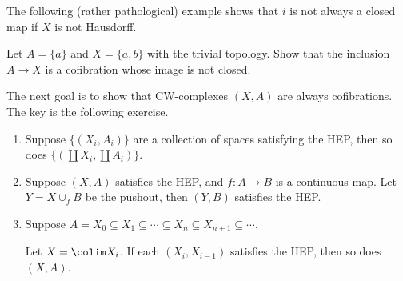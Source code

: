 \documentclass[ma3408.tex]{subfiles}
\begin{document}
The following (rather pathological) example shows that $i$ is not always a closed map if $X$ is not Hausdorff. 
\begin{exercise}{}{}
Let $A = \{ a \}$ and $X = \{ a , b\}$ with the trivial topology. Show that the inclusion $A \to X$ is a cofibration whose image is not closed. 
\end{exercise}
\begin{Rem}
The next goal is to show that CW-complexes $(X,A)$ are always cofibrations. The key is the following exercise. 
\end{Rem}
\begin{exercise}{}{}
\begin{enumerate}[label=(\alph*)]
  	\item Suppose $\{ (X_i,A_i)\}$ are a collection of spaces satisfying the HEP, then so does $\{ (\coprod X_i, \coprod A_i) \}$.
  	\item Suppose $(X,A)$ satisfies the HEP, and $f \colon A \to B$ is a continuous map. Let $Y = X \cup_f B$ be the pushout, then $(Y,B)$ satisfies the HEP. 
  	\item Suppose $A = X_0 \subseteq X_1 \subseteq \cdots \subseteq X_n \subseteq X_{n+1} \subseteq \cdots$.

  	Let $X = \colim X_i$. If each $(X_i,X_{i-1})$ satisfies the HEP, then so does $(X,A)$. 
  \end{enumerate}  
\end{exercise}
\end{document}
